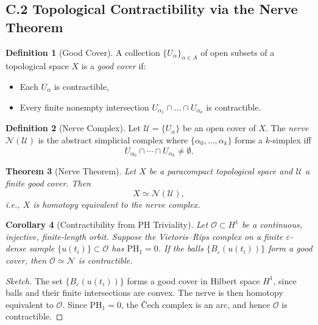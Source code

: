 \documentclass[11pt]{article}
\newtheorem{theorem}{Theorem}[section]
\newtheorem{corollary}[theorem]{Corollary}
\theoremstyle{definition}
\newtheorem{definition}[theorem]{Definition}
\begin{document}
\subsection*{C.2 Topological Contractibility via the Nerve Theorem}

\begin{definition}[Good Cover]
A collection \( \{ U_\alpha \}_{\alpha \in A} \) of open subsets of a topological space \( X \) is a \emph{good cover} if:
\begin{itemize}
  \item Each \( U_\alpha \) is contractible,
  \item Every finite nonempty intersection \( U_{\alpha_1} \cap \dots \cap U_{\alpha_k} \) is contractible.
\end{itemize}
\end{definition}

\begin{definition}[Nerve Complex]
Let \( \mathcal{U} = \{ U_\alpha \} \) be an open cover of \( X \). The \emph{nerve} \( \mathcal{N}(\mathcal{U}) \) is the abstract simplicial complex where \( \{ \alpha_0, \dots, \alpha_k \} \) forms a \( k \)-simplex iff
\[
U_{\alpha_0} \cap \cdots \cap U_{\alpha_k} \neq \emptyset.
\]
\end{definition}

\begin{theorem}[Nerve Theorem]
Let \( X \) be a paracompact topological space and \( \mathcal{U} \) a finite good cover. Then
\[
X \simeq \mathcal{N}(\mathcal{U}),
\]
i.e., \( X \) is homotopy equivalent to the nerve complex.
\end{theorem}

\begin{corollary}[Contractibility from PH Triviality]
Let \( \mathcal{O} \subset H^1 \) be a continuous, injective, finite-length orbit. Suppose the Vietoris–Rips complex on a finite \( \varepsilon \)-dense sample \( \{ u(t_i) \} \subset \mathcal{O} \) has \( \mathrm{PH}_1 = 0 \). If the balls \( \{ B_\varepsilon(u(t_i)) \} \) form a good cover, then \( \mathcal{O} \simeq \mathcal{N} \) is contractible.
\end{corollary}

\begin{proof}[Sketch]
The set \( \{ B_\varepsilon(u(t_i)) \} \) forms a good cover in Hilbert space \( H^1 \), since balls and their finite intersections are convex. The nerve is then homotopy equivalent to \( \mathcal{O} \). Since \( \mathrm{PH}_1 = 0 \), the Čech complex is an arc, and hence \( \mathcal{O} \) is contractible.
\end{proof}
\end{document}

